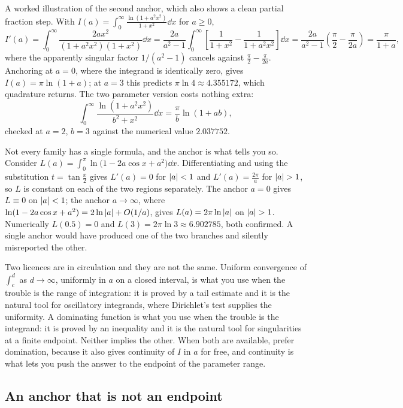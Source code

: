 A worked illustration of the second anchor, which also shows a clean partial fraction step. With $I(a)=\int_0^\infty\frac{\ln(1+a^{2}x^{2})}{1+x^{2}}\dd x$ for $a\geq0$,
\[I'(a)=\int_0^\infty\frac{2ax^{2}}{(1+a^{2}x^{2})(1+x^{2})}\dd x=\frac{2a}{a^{2}-1}\int_0^\infty\left[\frac{1}{1+x^{2}}-\frac{1}{1+a^{2}x^{2}}\right]\dd x=\frac{2a}{a^{2}-1}\left(\frac{\pi}{2}-\frac{\pi}{2a}\right)=\frac{\pi}{1+a},\]
where the apparently singular factor $1/(a^{2}-1)$ cancels against $\tfrac{\pi}{2}-\tfrac{\pi}{2a}$. Anchoring at $a=0$, where the integrand is identically zero, gives $I(a)=\pi\ln(1+a)$; at $a=3$ this predicts $\pi\ln4\approx4.355172$, which quadrature returns. The two parameter version costs nothing extra:
\[\int_0^\infty\frac{\ln(1+a^{2}x^{2})}{b^{2}+x^{2}}\dd x=\frac{\pi}{b}\ln(1+ab),\]
checked at $a=2$, $b=3$ against the numerical value $2.037752$.

Not every family has a single formula, and the anchor is what tells you so. Consider $L(a)=\int_0^{\pi}\ln\bigl(1-2a\cos x+a^{2}\bigr)\dd x$. Differentiating and using the substitution $t=\tan\tfrac x2$ gives $L'(a)=0$ for $\left\lvert a\right\rvert<1$ and $L'(a)=\tfrac{2\pi}{a}$ for $\left\lvert a\right\rvert>1$, so $L$ is constant on each of the two regions separately. The anchor $a=0$ gives $L\equiv0$ on $\left\lvert a\right\rvert<1$; the anchor $a\to\infty$, where $\ln(1-2a\cos x+a^{2})=2\ln\left\lvert a\right\rvert+O(1/a)$, gives $L(a)=2\pi\ln\left\lvert a\right\rvert$ on $\left\lvert a\right\rvert>1$. Numerically $L(0.5)=0$ and $L(3)=2\pi\ln3\approx6.902785$, both confirmed. A single anchor would have produced one of the two branches and silently misreported the other.

\begin{keynote}
Two licences are in circulation and they are not the same. Uniform convergence of $\int_c^{d}$ as $d\to\infty$, uniformly in $a$ on a closed interval, is what you use when the trouble is the range of integration: it is proved by a tail estimate and it is the natural tool for oscillatory integrands, where Dirichlet's test supplies the uniformity. A dominating function is what you use when the trouble is the integrand: it is proved by an inequality and it is the natural tool for singularities at a finite endpoint. Neither implies the other. When both are available, prefer domination, because it also gives continuity of $I$ in $a$ for free, and continuity is what lets you push the answer to the endpoint of the parameter range.
\end{keynote}

\subsection{An anchor that is not an endpoint}

